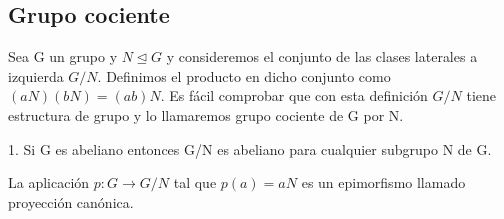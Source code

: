 \subsection{Grupo cociente}

\begin{ndef}
Sea G un grupo y $N \unlhd G$ y consideremos el conjunto de las clases laterales a izquierda $G/N$. Definimos el producto en dicho conjunto como $(aN)(bN) = (ab)N$. Es fácil comprobar que con esta definición $G/N$ tiene estructura de grupo y lo llamaremos grupo cociente de G por N.
\end{ndef}

\begin{ejemplo}
1. Si G es abeliano entonces G/N es abeliano para cualquier subgrupo N de G.
\end{ejemplo}

\begin{ndef}
La aplicación $p:G \rightarrow G/N$ tal que $p(a) = aN$ es un epimorfismo llamado proyección canónica.
\end{ndef}

